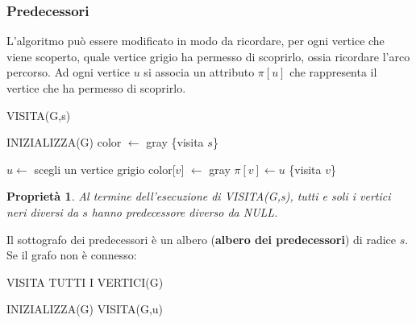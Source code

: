 \documentclass[11pt]{article}
\newtheorem*{proprietà}{Proprietà}
\theoremstyle{proprietà}
\begin{document}
\subsubsection{Predecessori}
L'algoritmo può essere modificato in modo da ricordare, per ogni vertice che viene scoperto, quale vertice grigio ha permesso 
di scoprirlo, ossia ricordare l'arco percorso. Ad ogni vertice $u$ si associa un attributo $\pi[u]$ che rappresenta il 
vertice che ha permesso di scoprirlo.
\begin{algorithm}[H]
    \caption{VISITA(G,s)}
    \begin{algorithmic}
        \State INIZIALIZZA(G)
        \State color $\gets$ gray
        \State \{visita $s$\}
    \end{algorithmic}
\end{algorithm}
\begin{algorithm}[H]
    \begin{algorithmic}
        \State $u \gets$ scegli un vertice grigio
                \State color[$v$] $\gets$ gray
                \State $\pi[v] \gets u$
                \State \{visita $v$\}
            \EndIf
        \EndWhile
    \end{algorithmic}
\end{algorithm}
\begin{proprietà}
    Al termine dell'esecuzione di VISITA(G,s), tutti e soli i vertici neri diversi da $s$ hanno predecessore diverso da 
    NULL.
\end{proprietà}
Il sottografo dei predecessori è un albero (\textbf{albero dei predecessori}) di radice $s$.\\
Se il grafo non è connesso:
\begin{algorithm}[H]
    \caption{VISITA TUTTI I VERTICI(G)}
    \begin{algorithmic}
        \State INIZIALIZZA(G)
            \State VISITA(G,u)
            \EndIf
        \EndFor
    \end{algorithmic}
\end{algorithm}
\end{document}
